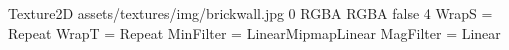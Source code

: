 Texture2D
assets/textures/img/brickwall.jpg
0
RGBA
RGBA
false
4
WrapS = Repeat
WrapT = Repeat
MinFilter = LinearMipmapLinear
MagFilter = Linear
